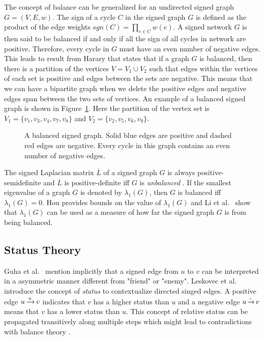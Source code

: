 The concept of balance can be generalized for an undirected signed graph $G=(V,E,w)$.
The sign of a cycle $C$ in the signed graph $G$ is defined as the product of the edge weights $sgn(C)=\prod_{e\in C}w(e)$.
A signed network $G$ is then said to be balanced if and only if all the sign of all cycles in network are positive.
Therefore, every cycle in $G$ must have an even number of negative edges.
This leads to result from Harary \cite{harary1953on} that states that if a graph $G$ is balanced, then there is a partition of the vertices $V = V_1 \cup V_2$ such that edges within the vertices of each set is positive and edges between the sets are negative.
This means that we can have a bipartite graph when we delete the positive edges and negative edges span between the two sets of vertices.
An example of a balanced signed graph is shown in Figure~\ref{fig:balanced-graph}.
Here the partition of the vertex set is $V_1 = \{v_1,v_3,v_4,v_7,v_8\}$ and $V_2 = \{v_2,v_5,v_6,v_9\}$.

\begin{figure}[!ht]
    \centering
    
    \caption{ A balanced signed graph. Solid blue edges are positive and dashed red edges are negative. Every cycle in this graph contains an even number of negative edges.}
    \label{fig:balanced-graph}
\end{figure}

The signed Laplacian matrix $\overline{L}$ of a signed graph $G$ is always positive-semidefinite and $\overline{L}$ is positive-definite iff $G$ is \textit{unbalanced} \cite{kunegis2010spectral,hou2005bounds,zaslavsky1982signed}.
If the smallest eigenvalue of a graph $G$ is denoted by $\lambda_{1}(G)$, then $G$ is balanced iff $\lambda_{1}(G)=0$.
Hou \cite{hou2005bounds} provides bounds on the value of $\lambda_{1}(G)$ and Li et al.\ \cite{li2016note} show that $\lambda_{1}(G)$ can be used as a measure of how far the signed graph $G$ is from being balanced.

\subsection{Status Theory}
\label{sec:status-theory}
Guha et al.\ \cite{guha2004propagation} mention implicitly that a signed edge from $u$ to $v$ can be interpreted in a asymmetric manner different from "friend" or "enemy".
Leskovec et al.\ \cite{leskovec2010signed,leskovec2010predicting} introduce the concept of \textit{status} to contextualize directed singed edges.
A positive edge $u \operatorname*{\xrightarrow{+}} v$ indicates that $v$ has a higher status than $u$ and a negative edge $u \operatorname*{\xrightarrow{-}} v$ means that $v$ has a lower status than $u$.
This concept of relative status can be propagated transitively along multiple steps which might lead to contradictions with balance theory \cite{leskovec2010signed}.

